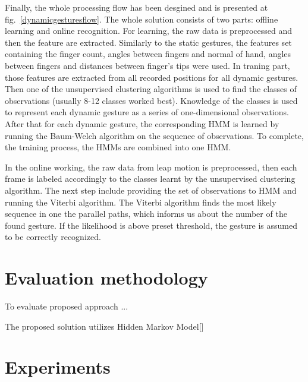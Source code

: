 Finally, the whole processing flow has been desgined and is presented at fig.~\ref{dynamicgesturesflow}.
The whole solution consists of two parts: offline learning and online recognition.
For learning, the raw data is preprocessed and then the feature are extracted. 
Similarly to the static gestures, the features set containing the finger count, angles between fingers and normal of hand, angles between fingers and distances between finger's tips were used. 
In traning part, those features are extracted from all recorded positions for all dynamic gestures.
Then one of the unsupervised clustering algorithms is used to find the classes of observations (usually 8-12 classes worked best).
Knowledge of the classes is used to represent each dynamic gesture as a series of one-dimensional observations.
After that for each dynamic gesture, the corresponding HMM is learned by running the Baum-Welch algorithm on the sequence of observations.
To complete, the training process, the HMMs are combined into one HMM.

In the online working, the raw data from leap motion is preprocessed, then each frame is labeled accordingly to the classes learnt by the unsupervised clustering algorithm.
The next step include providing the set of observations to HMM and running the Viterbi algorithm.
The Viterbi algorithm finds the most likely sequence in one the parallel paths, which informs us about the number of the found gesture. 
If the likelihood is above preset threshold, the gesture is assumed to be correctly recognized.


\section{Evaluation methodology}

To evaluate proposed approach ... 






  






The proposed solution utilizes Hidden Markov Model[] 



\section{Experiments}
